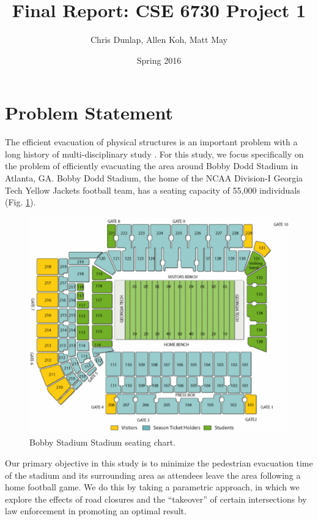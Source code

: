 \documentclass[12pt]{article}
\title{Final Report: CSE 6730 Project 1}
\author{Chris Dunlap, Allen Koh, Matt May}
\date{Spring 2016}
\begin{document}
\begin{titlepage}
  \maketitle
  \thispagestyle{empty}
\end{titlepage}

\newpage
  \tableofcontents
  \thispagestyle{empty}
\newpage

\section{Problem Statement}
\label{sec:problem}

The efficient evacuation of physical structures is an important problem with a
long history of multi-disciplinary study \cite{zheng2009modeling}. For this
study, we focus specifically on the problem of efficiently evacuating the
area around Bobby Dodd Stadium in Atlanta, GA. Bobby Dodd Stadium, the home of
the NCAA Division-I Georgia Tech Yellow Jackets football team, has a
seating capacity of 55,000 individuals (Fig. \ref{fig:stadiumseating}).

\begin{figure}[H]
  \includegraphics[width=\linewidth,natwidth=521,natheight=435]{stadium_diagram_updated.png}
  \caption{Bobby Stadium Stadium seating chart.}
  \label{fig:stadiumseating}
\end{figure}

Our primary objective in this study is to minimize the pedestrian evacuation
time of the stadium and its surrounding area as attendees leave the area
following a home football game. We do this by taking a parametric approach, in
which we explore the effects of road closures and the ``takeover'' of certain
intersections by law enforcement in promoting an optimal result.
\end{document}
